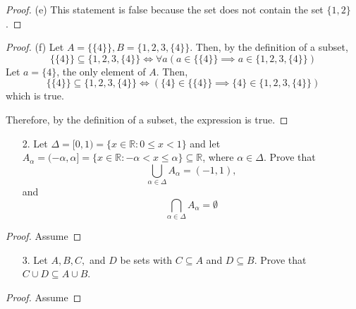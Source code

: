 \documentclass[10pt]{article}
\theoremstyle{definition}
\theoremstyle{plain}
\newcommand{\R}{\mathbb{R}}
\begin{document}
\begin{proof}{(e)}
  This statement is false because the set does not contain the set $\{1,2\}$.
\end{proof}

\begin{proof}{(f)}
  Let $A=\{\{4\}\}, B = \{1,2,3,\{4\}\}$. Then, by the definition of a subset,
  \begin{equation*}
    \{\{4\}\} \subseteq \{1,2,3,\{4\}\} \iff \forall a(a\in \{\{4\}\} \implies a\in \{1,2,3,\{4\}\})
  \end{equation*}
  Let $a=\{4\}$, the only element of $A$. Then,
  \begin{equation*}
      \{\{4\}\} \subseteq \{1,2,3,\{4\}\} \iff (\{4\}\in \{\{4\}\} \implies \{4\}\in \{1,2,3,\{4\}\})
  \end{equation*}
  which is true. \\

  \par Therefore, by the definition of a subset, the expression is true.
\end{proof}



\pagebreak



\begin{enumerate}
  \item[2.] Let $\Delta = [0,1) = \{x \in \R: 0 \leq x < 1\}$ and let $A_\alpha = (-\alpha,\alpha] = \{x \in \R: -\alpha < x \leq \alpha\} \subseteq \R$, where $\alpha \in \Delta$.  Prove that
      $$\bigcup_{\alpha \in \Delta} A_\alpha = (-1,1),$$
   and
      $$\bigcap_{\alpha \in \Delta} A_\alpha = \emptyset$$
\end{enumerate}

\begin{proof}
  Assume
\end{proof}



\pagebreak



\begin{enumerate}
  \item[3.] Let $A, B, C,$ and $D$ be sets with $C \subseteq A$ and $D \subseteq B$.  Prove that $C \cup D \subseteq A \cup B$.
\end{enumerate}

\begin{proof}
  Assume
\end{proof}
\end{document}
